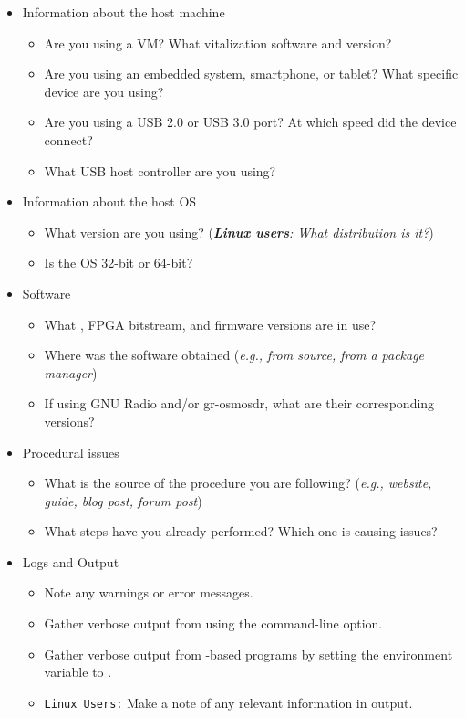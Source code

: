 {\footnotesize
\begin{itemize}
    \item Information about the host machine
    \begin{itemize}
        \item Are you using a VM? What vitalization software and version?
        \item Are you using an embedded system, smartphone, or tablet? What specific device are you using?
        \item Are you using a USB 2.0 or USB 3.0 port? At which speed did the device connect?
        \item What USB host controller are you using?
    \end{itemize}

    \item Information about the host OS
    \begin{itemize}
        \item What version are you using? (\textit{\textbf{Linux users}: What distribution is it?})
        \item Is the OS 32-bit or 64-bit?
    \end{itemize}

     \item Software
     \begin{itemize}
         \item What \libbladerf, FPGA bitstream, and  firmware versions are in use?
         \item Where was the software obtained (\textit{e.g., from source, from a package manager})
         \item If using GNU Radio and/or gr-osmosdr, what are their corresponding versions?
     \end{itemize}

    \item Procedural issues
    \begin{itemize}
        \item What is the source of the procedure you are following? (\textit{e.g., website, guide, blog post, forum post})
        \item What steps have you already performed? Which one is causing issues?
    \end{itemize}

    \item Logs and Output
    \begin{itemize}
        \item Note any warnings or error messages.
        \item Gather verbose output from \bladerfcli using the  command-line option.
        \item Gather verbose output from \libbladerf-based programs by setting the  environment variable to .
        \item \texttt{Linux Users:} Make a note of any relevant information in  output.
    \end{itemize}
\end{itemize}
}

